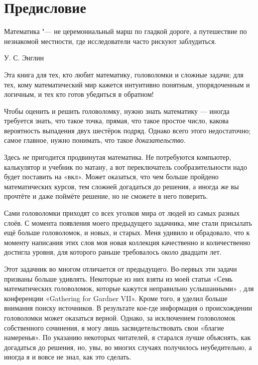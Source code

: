 \chapter*{Предисловие}

\setlength{\epigraphwidth}{.6\textwidth}
\epigraph{Математика "--- не церемониальный марш по гладкой дороге, а путешествие по незнакомой местности, где исследователи часто рискуют заблудиться.
}{У. С. Энглин
}

Эта книга для тех, кто любит математику, головоломки и сложные задачи;
для тех, кому математический мир кажется интуитивно понятным, упорядоченным и логичным, и тех кто готов убедиться в обратном!

Чтобы оценить и решить головоломку, нужно знать математику --- 
иногда требуется знать, что такое точка, прямая, что такое простое число, какова вероятность выпадения двух шестёрок подряд.
Однако всего этого недостаточно; самое главное, нужно понимать, что такое \emph{доказательство}.

Здесь \emph{не} пригодится продвинутая математика.
Не потребуются компьютер, калькулятор и учебник по матану,
а вот переключатель сообразительности надо будет поставить на «вкл».
Может оказаться, что чем больше пройдено математических курсов, тем сложней догадаться до решения,
а иногда же вы прочтёте и даже поймёте решение, но не сможете в него поверить.

Сами головоломки приходят со всех уголков мира от людей из самых разных слоёв.
С момента появления моего предыдущего задачника, мне стали присылать ещё больше головоломок, и новых, и старых.
Меня удивило и обрадовало, что к моменту написания этих слов моя новая коллекция качественно и количественно достигла уровня, для которого раньше требовалось около двадцати лет.

Этот задачник во многом отличается от предыдущего.
Во-первых эти задачи призваны больше удивлять.
Некоторые из них взяты из моей статьи «Семь математических головоломок, которые кажутся неправильно услышанными» \cite{winkler-7}, для конференции «Gathering for Gard\-ner VII».
Кроме того, я уделил больше внимания поиску источников.
В результате кое-где информация о происхождении головоломки может оказаться верной.
Однако, за исключением головоломок собственного сочинения, я могу лишь засвидетельствовать свои «благие намеренья».
По указанию некоторых читателей, я старался лучше объяснять, как догадаться до решения,
но, увы, во многих случаях получилось неубедительно, а иногда я и вовсе не знал, как это сделать.

